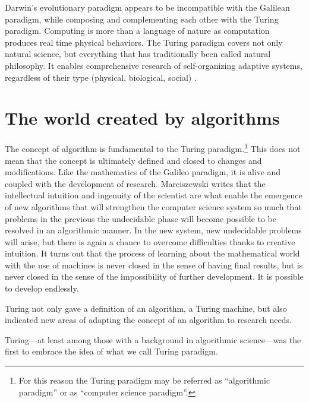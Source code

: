 \documentclass[pdftex,12pt]{article}
\begin{document}
Darwin's evolutionary paradigm appears to be incompatible with the Galilean paradigm, while composing and complementing each other with the Turing paradigm. Computing is more than a language of nature as computation produces real time physical behaviors. The Turing paradigm covers not only natural science, but everything that has traditionally been called natural philosophy.  It enables comprehensive research of self-organizing adaptive systems, regardless of their type (physical, biological, social) \parencite{Dodig2013,Dodig2022}.



\section{The world created by algorithms} 

The concept of algorithm is fundamental to the Turing paradigm.\footnote{For this reason the Turing paradigm may be referred as ``algorithmic paradigm'' or as ``computer science paradigm''.} This does not mean that the concept is ultimately defined and closed to changes and modifications. Like the mathematics of the Galileo paradigm, it is alive and coupled with the development of research. Marciszewski writes \parencite[p.164]{MarciszewskiStacewicz2011} that the intellectual intuition and ingenuity of the scientist are what enable the emergence of new algorithms that will strengthen the computer science system so much that problems in the previous the undecidable phase will become possible to be resolved in an algorithmic manner. In the new system, new undecidable problems will arise, but there is again a chance to overcome difficulties thanks to creative intuition. It turns out that the process of learning about the mathematical world with the use of machines is never closed in the sense of having final results, but is never closed in the sense of the impossibility of further development. It is possible to develop endlessly.

Turing not only gave a definition of an algorithm, a Turing machine, but also indicated new areas of adapting the concept of an algorithm to research needs.

Turing---at least among those with a background  in algorithmic science---was the first to embrace the idea of what we call Turing paradigm.
\end{document}
